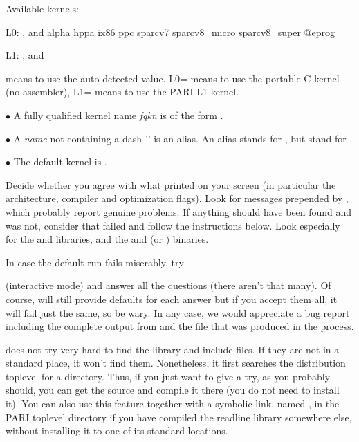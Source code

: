 \noindent Available kernels:

L0: ,  and
\bprog
alpha  hppa  ix86  ppc  sparcv7  sparcv8_micro  sparcv8_super
@eprog

L1: ,  and 

\noindent {} means to use the auto-detected value. L0= means
to use the portable C kernel (no assembler), L1= means to use the
PARI L1 kernel. 

\noindent$\bullet$ A fully qualified kernel name \emph{fqkn} is of the form
.

\noindent$\bullet$ A \emph{name} not containing a dash '\kbd{-}' is an alias.
An alias stands for , but  stand for
.

\noindent$\bullet$ The default kernel is .


 Decide whether you agree with what
 printed on your screen (in particular the architecture,
compiler and optimization flags). Look for messages prepended by
\kbd{\#\#\#}, which probably report genuine problems. If anything should have
been found and was not, consider that  failed and follow the
instructions below. Look especially for the  and 
libraries, and the  and  (or ) binaries.

In case the default  run fails miserably, try


\noindent (interactive mode) and answer all the questions (there aren't that
many). Of course,  will still provide defaults for each answer
but if you accept them all, it will fail just the same, so be wary. In any
case, we would appreciate a bug report including the complete output from
 and the file  that was produced in
the process.


 does not try very hard to find the  library and
include files. If they are not in a standard place, it won't find them.
Nonetheless, it first searches the distribution toplevel for a 
directory. Thus, if you just want to give  a try, as you
probably should, you can get the source and compile it there (you do not need
to install it). You can also use this feature together with a symbolic link,
named , in the PARI toplevel directory if you have compiled the
readline library somewhere else, without installing it to one of its standard
locations. 

